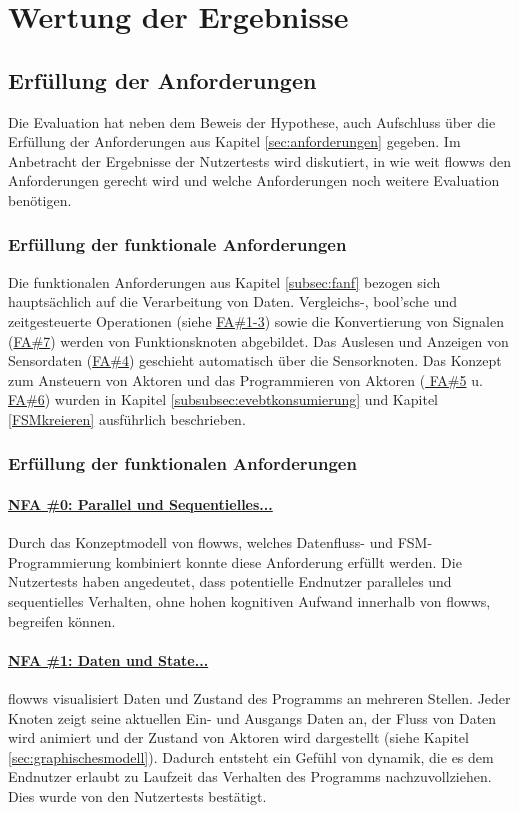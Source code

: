 \section{Wertung der Ergebnisse}

\subsection{Erfüllung der Anforderungen}
Die Evaluation hat neben dem Beweis der Hypothese, auch Aufschluss über die Erfüllung der Anforderungen aus Kapitel \ref{sec:anforderungen} gegeben. Im Anbetracht der Ergebnisse der Nutzertests wird diskutiert, in wie weit flowws den Anforderungen gerecht wird und welche Anforderungen noch weitere Evaluation benötigen.

\subsubsection{Erfüllung der funktionale Anforderungen}
Die funktionalen Anforderungen aus Kapitel \ref{subsec:fanf} bezogen sich hauptsächlich auf die Verarbeitung von Daten. Vergleichs-, bool'sche und zeitgesteuerte Operationen (siehe \hyperref[tab:fanf]{FA\#1-3}) sowie die Konvertierung von Signalen (\hyperref[tab:fanf]{FA\#7}) werden von Funktionsknoten abgebildet. Das Auslesen und Anzeigen von Sensordaten (\hyperref[tab:fanf]{FA\#4}) geschieht automatisch über die Sensorknoten. Das Konzept zum Ansteuern von Aktoren und das Programmieren von Aktoren (\hyperref[tab:fanf]{ FA\#5} u. \hyperref[tab:fanf]{ FA\#6}) wurden in Kapitel \ref{subsubsec:evebtkonsumierung} und Kapitel \ref{FSMkreieren} ausführlich beschrieben.

\subsubsection{Erfüllung der funktionalen Anforderungen}
\paragraph{\hyperref[tab:NFA0]{NFA \#0: Parallel und Sequentielles...}} Durch das Konzeptmodell von flowws, welches Datenfluss- und \ac{FSM}-Programmierung kombiniert konnte diese Anforderung erfüllt werden. Die Nutzertests haben angedeutet, dass potentielle Endnutzer paralleles und sequentielles Verhalten, ohne hohen kognitiven Aufwand innerhalb von flowws, begreifen können.

\paragraph{\hyperref[tab:NFA1]{NFA \#1: Daten und State...}} flowws visualisiert Daten und Zustand des Programms an mehreren Stellen. Jeder Knoten zeigt seine aktuellen Ein- und Ausgangs Daten an, der Fluss von Daten wird animiert und der Zustand von Aktoren wird dargestellt (siehe Kapitel \ref{sec:graphischesmodell}). Dadurch entsteht ein Gefühl von dynamik, die es dem Endnutzer erlaubt zu Laufzeit das Verhalten des Programms nachzuvollziehen. Dies wurde von den Nutzertests bestätigt.

